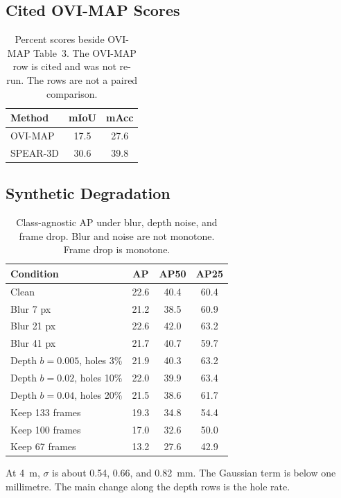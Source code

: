 \documentclass[10pt,letterpaper]{article}
\begin{document}
\subsection{Cited OVI-MAP Scores}
\begin{table}[H]
\centering
\caption{Percent scores beside OVI-MAP Table~3.
The OVI-MAP row is cited and was not re-run.
The rows are not a paired comparison.}
\label{tab:ovimap}
\begin{tabular}{lcc}
\toprule
Method & mIoU & mAcc \\
\midrule
OVI-MAP & 17.5 & 27.6 \\
SPEAR-3D & 30.6 & 39.8 \\
\bottomrule
\end{tabular}
\end{table}

\subsection{Synthetic Degradation}
\begin{table}[H]
\centering
\caption{Class-agnostic AP under blur, depth noise, and frame drop.
Blur and noise are not monotone.
Frame drop is monotone.}
\label{tab:robust}
\begin{tabular}{lccc}
\toprule
Condition & AP & AP50 & AP25 \\
\midrule
Clean & 22.6 & 40.4 & 60.4 \\
Blur 7 px & 21.2 & 38.5 & 60.9 \\
Blur 21 px & 22.6 & 42.0 & 63.2 \\
Blur 41 px & 21.7 & 40.7 & 59.7 \\
Depth \(b{=}0.005\), holes 3\% & 21.9 & 40.3 & 63.2 \\
Depth \(b{=}0.02\), holes 10\% & 22.0 & 39.9 & 63.4 \\
Depth \(b{=}0.04\), holes 20\% & 21.5 & 38.6 & 61.7 \\
Keep 133 frames & 19.3 & 34.8 & 54.4 \\
Keep 100 frames & 17.0 & 32.6 & 50.0 \\
Keep 67 frames & 13.2 & 27.6 & 42.9 \\
\bottomrule
\end{tabular}
\end{table}

\noindent
At 4~m, \(\sigma\) is about 0.54, 0.66, and 0.82~mm.
The Gaussian term is below one millimetre.
The main change along the depth rows is the hole rate.
\end{document}
